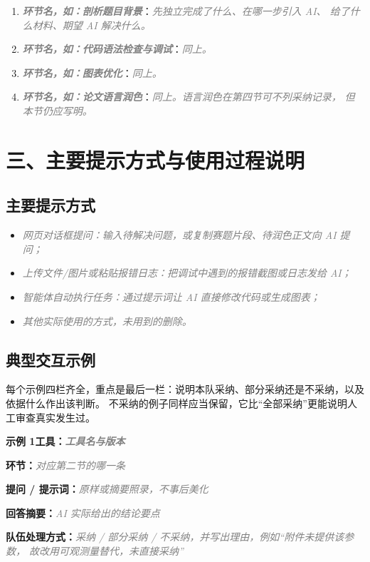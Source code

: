 \documentclass[UTF8,a4paper,12pt]{ctexart}
\newcommand{\Fill}[1]{\textcolor{gray}{\textit{#1}}}
\newcommand{\Field}[1]{\par\noindent\textbf{#1}}
\begin{document}
\begin{enumerate}
  \item \textbf{\Fill{环节名，如：剖析题目背景}}：\Fill{先独立完成了什么、在哪一步引入 AI、
        给了什么材料、期望 AI 解决什么。}
  \item \textbf{\Fill{环节名，如：代码语法检查与调试}}：\Fill{同上。}
  \item \textbf{\Fill{环节名，如：图表优化}}：\Fill{同上。}
  \item \textbf{\Fill{环节名，如：论文语言润色}}：\Fill{同上。语言润色在第四节可不列采纳记录，
        但本节仍应写明。}
\end{enumerate}

\section*{三、主要提示方式与使用过程说明}

\subsection*{主要提示方式}

\begin{itemize}
  \item \Fill{网页对话框提问：输入待解决问题，或复制赛题片段、待润色正文向 AI 提问；}
  \item \Fill{上传文件/图片或粘贴报错日志：把调试中遇到的报错截图或日志发给 AI；}
  \item \Fill{智能体自动执行任务：通过提示词让 AI 直接修改代码或生成图表；}
  \item \Fill{其他实际使用的方式，未用到的删除。}
\end{itemize}

\subsection*{典型交互示例}

每个示例四栏齐全，重点是最后一栏：说明本队采纳、部分采纳还是不采纳，以及依据什么作出该判断。
不采纳的例子同样应当保留，它比“全部采纳”更能说明人工审查真实发生过。

\vspace{0.3em}
\noindent\textbf{示例 1\quad 工具：\Fill{工具名与版本}}
\Field{环节：}\Fill{对应第二节的哪一条}
\Field{提问 / 提示词：}\Fill{原样或摘要照录，不事后美化}
\Field{回答摘要：}\Fill{AI 实际给出的结论要点}
\Field{队伍处理方式：}\Fill{采纳 / 部分采纳 / 不采纳，并写出理由，例如“附件未提供该参数，
故改用可观测量替代，未直接采纳”}
\end{document}
